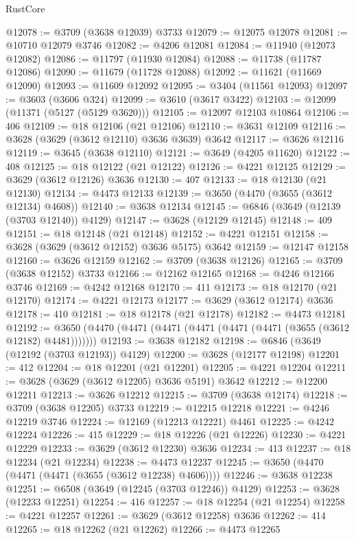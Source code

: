 \begin{lexlean}{RustCore}
\begin{coremodule}
@12078 := @3709 (@3638 @12039) @3733
@12079 := @12075 @12078
@12081 := @10710 @12079 @3746
@12082 := @4206 @12081
@12084 := @11940 (@12073 @12082)
@12086 := @11797 (@11930 @12084)
@12088 := @11738 (@11787 @12086)
@12090 := @11679 (@11728 @12088)
@12092 := @11621 (@11669 @12090)
@12093 := @11609 @12092
@12095 := @3404 (@11561 @12093)
@12097 := @3603 (@3606 @324)
@12099 := @3610 (@3617 @3422)
@12103 := @12099 (@11371 (@5127 (@5129 @3620)))
@12105 := @12097 @12103 @10864
@12106 := 406
@12109 := @18 @12106 (@21 @12106)
@12110 := @3631 @12109
@12116 := @3628 (@3629 (@3612 @12110) @3636 @3639) @3642
@12117 := @3626 @12116
@12119 := @3645 (@3638 @12110)
@12121 := @3649 (@4205 @11620)
@12122 := 408
@12125 := @18 @12122 (@21 @12122)
@12126 := @4221 @12125
@12129 := @3629 (@3612 @12126) @3636
@12130 := 407
@12133 := @18 @12130 (@21 @12130)
@12134 := @4473 @12133
@12139 := @3650 (@4470 (@3655 (@3612 @12134) @4608))
@12140 := @3638 @12134
@12145 := @6846 (@3649 (@12139 (@3703 @12140)) @4129)
@12147 := @3628 (@12129 @12145)
@12148 := 409
@12151 := @18 @12148 (@21 @12148)
@12152 := @4221 @12151
@12158 := @3628 (@3629 (@3612 @12152) @3636 @5175) @3642
@12159 := @12147 @12158
@12160 := @3626 @12159
@12162 := @3709 (@3638 @12126)
@12165 := @3709 (@3638 @12152) @3733
@12166 := @12162 @12165
@12168 := @4246 @12166 @3746
@12169 := @4242 @12168
@12170 := 411
@12173 := @18 @12170 (@21 @12170)
@12174 := @4221 @12173
@12177 := @3629 (@3612 @12174) @3636
@12178 := 410
@12181 := @18 @12178 (@21 @12178)
@12182 := @4473 @12181
@12192 := @3650 (@4470 (@4471 (@4471 (@4471 (@4471 (@4471 (@3655 (@3612 @12182) @4481)))))))
@12193 := @3638 @12182
@12198 := @6846 (@3649 (@12192 (@3703 @12193)) @4129)
@12200 := @3628 (@12177 @12198)
@12201 := 412
@12204 := @18 @12201 (@21 @12201)
@12205 := @4221 @12204
@12211 := @3628 (@3629 (@3612 @12205) @3636 @5191) @3642
@12212 := @12200 @12211
@12213 := @3626 @12212
@12215 := @3709 (@3638 @12174)
@12218 := @3709 (@3638 @12205) @3733
@12219 := @12215 @12218
@12221 := @4246 @12219 @3746
@12224 := @12169 (@12213 @12221) @4461
@12225 := @4242 @12224
@12226 := 415
@12229 := @18 @12226 (@21 @12226)
@12230 := @4221 @12229
@12233 := @3629 (@3612 @12230) @3636
@12234 := 413
@12237 := @18 @12234 (@21 @12234)
@12238 := @4473 @12237
@12245 := @3650 (@4470 (@4471 (@4471 (@3655 (@3612 @12238) @4606))))
@12246 := @3638 @12238
@12251 := @6508 (@3649 (@12245 (@3703 @12246)) @4129)
@12253 := @3628 (@12233 @12251)
@12254 := 416
@12257 := @18 @12254 (@21 @12254)
@12258 := @4221 @12257
@12261 := @3629 (@3612 @12258) @3636
@12262 := 414
@12265 := @18 @12262 (@21 @12262)
@12266 := @4473 @12265

\end{coremodule}
\end{lexlean}
